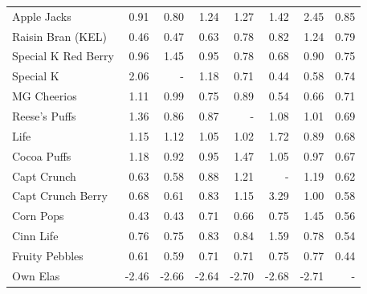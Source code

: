 \documentclass[handout, serif, aspectratio=169, 10pt]{beamer}
\begin{document}
\begin{frame}[plain]
\begin{center}
{\begin{tabular}{lrrrrrrr}
Apple Jacks         &      0.91 &       0.80 &         1.24 &           1.27 &         1.42 &         2.45 &    0.85 \\
Raisin Bran (KEL)   &      0.46 &       0.47 &         0.63 &           0.78 &         0.82 &         1.24 &    0.79 \\
Special K Red Berry &      0.96 &       1.45 &         0.95 &           0.78 &         0.68 &         0.90 &    0.75 \\
Special K           &      2.06 &      - &         1.18 &           0.71 &         0.44 &         0.58 &    0.74 \\
MG Cheerios         &      1.11 &       0.99 &         0.75 &           0.89 &         0.54 &         0.66 &    0.71 \\
Reese's Puffs       &      1.36 &       0.86 &         0.87 &          - &         1.08 &         1.01 &    0.69 \\
Life                &      1.15 &       1.12 &         1.05 &           1.02 &         1.72 &         0.89 &    0.68 \\
Cocoa Puffs         &      1.18 &       0.92 &         0.95 &           1.47 &         1.05 &         0.97 &    0.67 \\
Capt Crunch         &      0.63 &       0.58 &         0.88 &           1.21 &        - &         1.19 &    0.62 \\
Capt Crunch Berry   &      0.68 &       0.61 &         0.83 &           1.15 &         3.29 &         1.00 &    0.58 \\
Corn Pops           &      0.43 &       0.43 &         0.71 &           0.66 &         0.75 &         1.45 &    0.56 \\
Cinn Life           &      0.76 &       0.75 &         0.83 &           0.84 &         1.59 &         0.78 &    0.54 \\
Fruity Pebbles      &      0.61 &       0.59 &         0.71 &           0.71 &         0.75 &         0.77 &    0.44 \\
\midrule
Own Elas            &      -2.46&       -2.66 &       -2.64 &           -2.70 &        -2.68 &       -2.71 &  - \\
\bottomrule
\end{tabular}
}
\end{center}
\end{frame}
\end{document}
